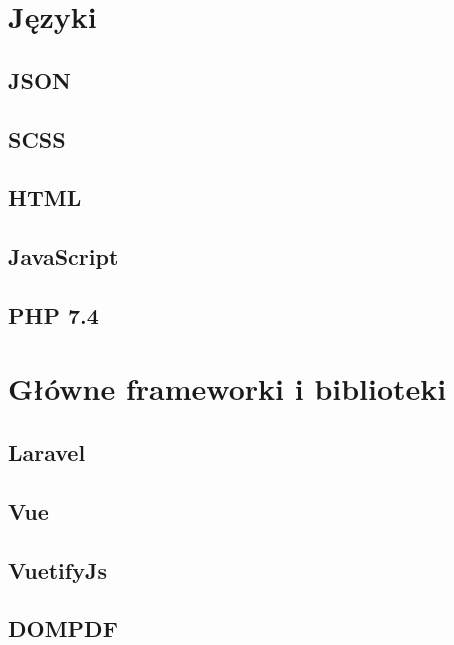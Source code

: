 \documentclass[12pt]{report}
\begin{document}
        \section{Języki}
            \subsection{JSON}
                
            \subsection{SCSS}
                
            \subsection{HTML}
                
            \subsection{JavaScript}
                
            \subsection{PHP 7.4}
                
        \section{Główne frameworki i biblioteki}
            \subsection{Laravel}
                
            \subsection{Vue}
                
            \subsection{VuetifyJs}
                
            \subsection{DOMPDF}
                
\end{document}
